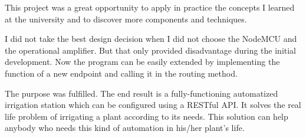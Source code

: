 This project was a great opportunity to apply in practice the concepts I learned at the university \cite{Danescu2018} and to discover more components and techniques.

I did not take the best design decision when I did not choose the NodeMCU and the operational amplifier. But that only provided disadvantage during the initial development. Now the program can be easily extended by implementing the function of a new endpoint and calling it in the routing method.

The purpose was fulfilled. The end result is a fully-functioning automatized irrigation station which can be configured using a RESTful API. It solves the real life problem of irrigating a plant according to its needs. This solution can help anybody who needs this kind of automation in his/her plant's life.
